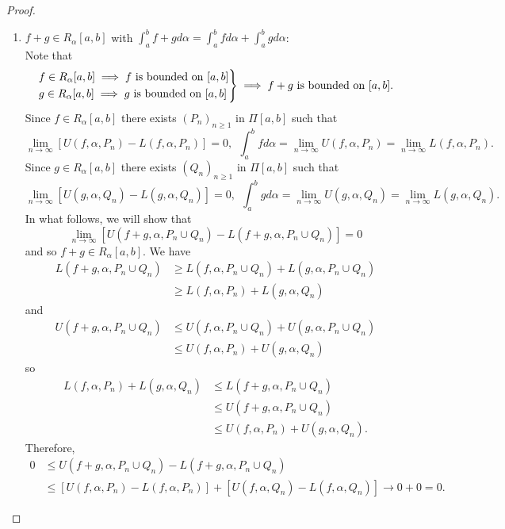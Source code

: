 \begin{proof}
\begin{enumerate}
        \item $f+g \in R_\alpha[a,b]$ with $\int_a^bf + g d\alpha = \int_a^b f d\alpha + \int_a^b g d\alpha$: \\
        Note that
        $$\begin{rcases*}
            f \in R_\alpha[a,b] \implies f \text{ is bounded on } [a,b] \\
            g \in R_\alpha[a,b] \implies g \text{ is bounded on } [a,b]
        \end{rcases*} \implies f+g \text{ is bounded on } [a,b].$$
        Since $f \in R_\alpha[a,b]$ there exists $(P_n)_{n \geq 1}$ in $\Pi[a,b]$ such that 
        $$\lim_{n\to \infty}\left[U(f, \alpha, P_n) - L(f, \alpha, P_n)\right] = 0, ~~\int_a^b fd \alpha = \lim_{n \to \infty}U(f, \alpha, P_n) = \lim_{n \to \infty}L(f, \alpha, P_n).$$
        Since $g \in R_\alpha[a,b]$ there exists $(Q_n)_{n \geq 1}$ in $\Pi[a,b]$ such that
        $$\lim_{n \to \infty}\left[U(g, \alpha, Q_n) - L(g, \alpha, Q_n)\right] = 0, ~~\int_a^bg d \alpha = \lim_{n \to \infty}U(g, \alpha, Q_n) = \lim_{n\to \infty}L(g, \alpha, Q_n).$$
        In what follows, we will show that
        $$\lim_{n \to \infty}\left[U(f+g, \alpha, P_n \cup Q_n) - L(f+g, \alpha, P_n \cup Q_n)\right] = 0$$
        and so $f+g \in R_\alpha[a,b]$. We have
        \begin{align*}
            L(f+g, \alpha, P_n \cup Q_n) &\geq L(f, \alpha, P_n \cup Q_n) + L(g, \alpha, P_n \cup Q_n) \\
            &\geq L(f, \alpha, P_n) + L(g, \alpha, Q_n)
        \end{align*}
        and
        \begin{align*}
            U(f+g, \alpha, P_n \cup Q_n) &\leq U(f, \alpha, P_n \cup Q_n) + U(g, \alpha, P_n \cup Q_n) \\
            &\leq U(f, \alpha, P_n) + U(g, \alpha, Q_n)
        \end{align*}
        so
        \begin{align*}
            L(f, \alpha, P_n) + L(g, \alpha, Q_n) &\leq L(f+g, \alpha, P_n \cup Q_n) \\
            &\leq U(f+g, \alpha, P_n \cup Q_n) \\
            &\leq U(f, \alpha, P_n) + U(g, \alpha, Q_n).
        \end{align*}
        Therefore,
        \begin{align*}
            0 &\leq U(f+g, \alpha, P_n \cup Q_n) - L(f+g, \alpha, P_n \cup Q_n) \\ &\leq \left[U(f, \alpha, P_n) - L(f, \alpha, P_n)\right] + \left[U(f, \alpha, Q_n) - L(f, \alpha, Q_n)\right] \to 0 + 0 = 0.

\end{align*}
\end{enumerate}
\end{proof}

